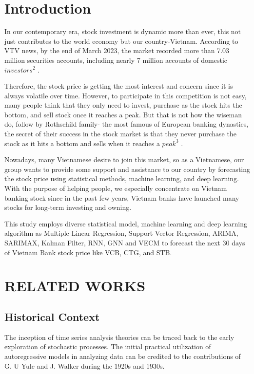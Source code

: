 \documentclass{ieeeojies}
\begin{document}
\section{Introduction}
\label{sec:introduction}
In our contemporary era, stock investment is dynamic more than ever, this not just contributes to the world economy but our country-Vietnam. According to VTV news, by the end of March 2023, the market recorded more than 7.03 million securities accounts, including nearly 7 million accounts of domestic $investors^2$ . 

Therefore, the stock price is getting the most interest and concern since it is always volatile over time. However, to participate in this competition is not easy, many people think that they only need to invest, purchase as the stock hits the bottom, and sell stock once it reaches a peak. But that is not how the wiseman do, follow by Rothschild family- the most famous of European banking dynasties, the secret of their success in the stock market is that they never purchase the stock as it hits a bottom and sells when it reaches a $peak^3$ . 

Nowadays, many Vietnamese desire to join this market, so as a Vietnamese, our group wants to provide some support and assistance to our country by forecasting the stock price using statistical methods, machine learning, and deep learning. With the purpose of helping people, we especially concentrate on Vietnam banking stock since in the past few years, Vietnam banks have launched many stocks for long-term investing and owning.

This study employs diverse statistical model, machine learning and deep learning algorithm as Multiple Linear Regression, Support Vector Regression, ARIMA, SARIMAX, Kalman Filter, RNN, GNN and VECM to forecast the next 30 days of Vietnam Bank stock price like VCB, CTG, and STB.

\section{RELATED WORKS}
\subsection{Historical Context}
The inception of time series analysis theories can be traced back to the early exploration of stochastic processes. The initial practical utilization of autoregressive models in analyzing data can be credited to the contributions of G. U Yule and J. Walker during the 1920s and 1930s.
\end{document}

